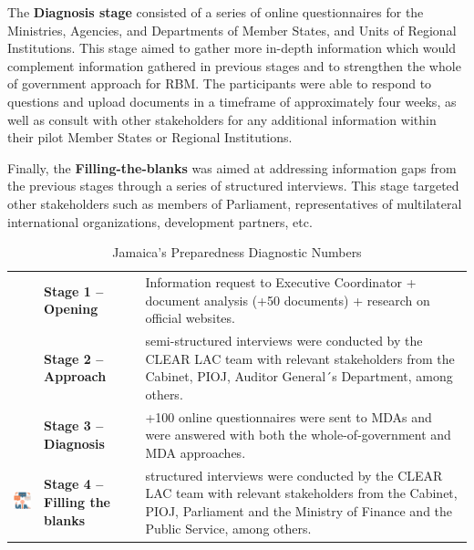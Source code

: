 \documentclass[
  10pt,
]{book}
\begin{document}
The \textbf{Diagnosis stage} consisted of a series of online questionnaires for the Ministries, Agencies, and Departments of Member States, and Units of Regional Institutions. This stage aimed to gather more in-depth information which would complement information gathered in previous stages and to strengthen the whole of government approach for RBM. The participants were able to respond to questions and upload documents in a timeframe of approximately four weeks, as well as consult with other stakeholders for any additional information within their pilot Member States or Regional Institutions.

Finally, the \textbf{Filling-the-blanks} was aimed at addressing information gaps from the previous stages through a series of structured interviews. This stage targeted other stakeholders such as members of Parliament, representatives of multilateral international organizations, development partners, etc.

\begin{longtable}[]{@{}
  >{\raggedright\arraybackslash}p{}
  >{\centering\arraybackslash}p{}
  >{\raggedleft\arraybackslash}p{}@{}}
\caption{\label{tab:table1} Jamaica's Preparedness Diagnostic Numbers}\tabularnewline
\toprule
\endhead
& \textbf{Stage 1 -- Opening} & Information request to Executive Coordinator + document analysis (+50 documents) + research on official websites. \\
& \textbf{Stage 2 -- Approach} & 6 semi-structured interviews were conducted by the CLEAR LAC team with relevant stakeholders from the Cabinet, PIOJ, Auditor General´s Department, among others. \\
& \textbf{Stage 3 -- Diagnosis} & +100 online questionnaires were sent to MDAs and were answered with both the whole-of-government and MDA approaches. \\
\includegraphics{./images/tb1_4.png} & \textbf{Stage 4 -- Filling the blanks} & 7 structured interviews were conducted by the CLEAR LAC team with relevant stakeholders from the Cabinet, PIOJ, Parliament and the Ministry of Finance and the Public Service, among others. \\
\bottomrule
\end{longtable}
\end{document}
